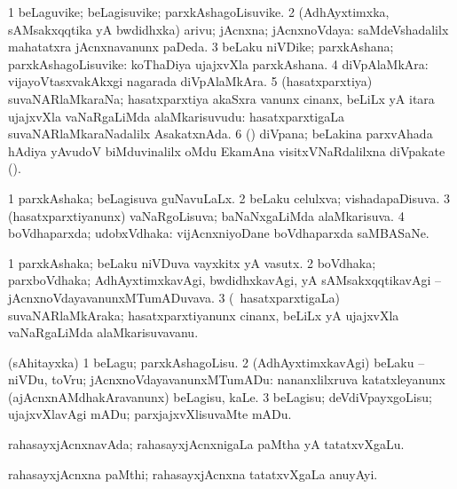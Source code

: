 \bentry
{}
\gl{\nA}
\bmng
\bnum
\num{1} beLaguvike; beLagisuvike; parxkAshagoLisuvike. 
\num{2} (AdhAyxtimxka, sAMsakxqqtika yA bwdidhxka) arivu; jAcnxna; jAcnxnoVdaya:  saMdeVshadalilx mahatatxra jAcnxnavanunx paDeda. 
\num{3} beLaku niVDike; parxkAshana; parxkAshagoLisuvike:  koThaDiya ujajxvXla parxkAshana. 
\num{4} diVpAlaMkAra:  vijayoVtasxvakAkxgi nagarada diVpAlaMkAra. 
\num{5} (hasatxparxtiya) suvaNARlaMkaraNa; hasatxparxtiya akaSxra \mo vanunx cinanx, beLiLx yA itara ujajxvXla vaNaRgaLiMda alaMkarisuvudu:  hasatxparxtigaLa suvaNARlaMkaraNadalilx AsakatxnAda. 
\num{6} (\Bwvi) diVpana; beLakina parxvAhada hAdiya yAvudoV biMduvinalilx oMdu EkamAna visitxVNaRdalilxna diVpakate (). 
\enum
\emng
\eentry

\bentry
{}
\gl{\gu}
\bmng
\bnum
\num{1} parxkAshaka; beLagisuva guNavuLaLx. 
\num{2} beLaku celulxva; vishadapaDisuva. 
\num{3} (hasatxparxtiyanunx) vaNaRgoLisuva; baNaNxgaLiMda alaMkarisuva. 
\num{4} boVdhaparxda; udobxVdhaka:  vijAcnxniyoDane boVdhaparxda saMBASaNe. 
\enum
\emng
\eentry

\bentry
{}
\gl{\nA}
\bmng
\bnum
\num{1} parxkAshaka; beLaku niVDuva vayxkitx yA vasutx. 
\num{2} boVdhaka; parxboVdhaka; AdhAyxtimxkavAgi, bwdidhxkavAgi, yA sAMsakxqqtikavAgi -- jAcnxnoVdayavanunxMTumADuvava. 
\num{3} (\kanmu\ hasatxparxtigaLa) suvaNARlaMkAraka; hasatxparxtiyanunx cinanx, beLiLx yA ujajxvXla vaNaRgaLiMda alaMkarisuvavanu. 
\enum
\emng
\eentry

\bentry
{}
\gl{\sakirx}
\bmng
(sAhitayxka) 
\bnum
\num{1} beLagu; parxkAshagoLisu. 
\num{2} (AdhAyxtimxkavAgi) beLaku -- niVDu, toVru; jAcnxnoVdayavanunxMTumADu:  nananxlilxruva katatxleyanunx (ajAcnxnAMdhakAravanunx) beLagisu, kaLe. 
\num{3} beLagisu; deVdiVpayxgoLisu; ujajxvXlavAgi mADu; parxjajxvXlisuvaMte mADu. 
\enum
\emng
\eentry

\bentry
{}
\gl{\nA}
\bmng
rahasayxjAcnxnavAda; rahasayxjAcnxnigaLa paMtha yA tatatxvXgaLu. 
\emng
\eentry

\bentry
{}
\gl{\nA}
\bmng
rahasayxjAcnxna paMthi; rahasayxjAcnxna tatatxvXgaLa anuyAyi. 
\emng
\eentry

